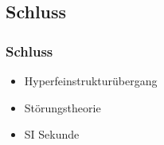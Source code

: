 \begin{frame}
\begin{figure}
\begin{tikzpicture}[font=\sffamily, scale=0.21, transform shape]
		
		
		
		\end{tikzpicture}
	\end{figure}
\end{frame}

\subsection{Schluss}

\begin{frame}
  \frametitle{Schluss}

  \begin{itemize}
  \item Hyperfeinstrukturübergang
  \item Störungstheorie
  \item SI Sekunde
  \end{itemize}

\end{frame}




